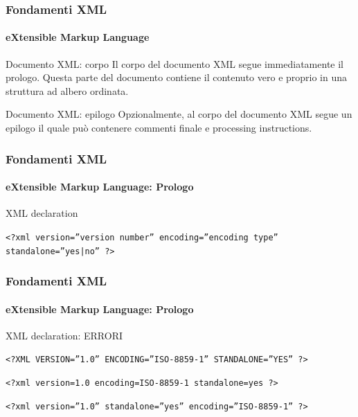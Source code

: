 \begin{frame}
	\frametitle{Fondamenti XML}
	\framesubtitle{eXtensible Markup Language}
	\addtocounter{nframe}{1}

	\begin{block}{Documento XML: corpo}
		Il corpo del documento XML segue immediatamente il prologo. Questa parte del documento contiene il contenuto vero e proprio in una struttura ad albero ordinata.
	\end{block}

	\begin{block}{Documento XML: epilogo}
		Opzionalmente, al corpo del documento XML segue un epilogo il quale può contenere commenti finale e processing instructions.
	\end{block}
	

\end{frame}

\begin{frame}
	\frametitle{Fondamenti XML}
	\framesubtitle{eXtensible Markup Language: Prologo}
	\addtocounter{nframe}{1}

	\begin{block}{XML declaration}
    \begin{center}\texttt{<?xml version=”version number” encoding=”encoding type” standalone=”yes|no” ?>}\end{center}
	\end{block}

\end{frame}


\begin{frame}
	\frametitle{Fondamenti XML}
	\framesubtitle{eXtensible Markup Language: Prologo}
	\addtocounter{nframe}{1}

	\begin{block}{XML declaration: ERRORI}
	\begin{center}\texttt{<?XML VERSION=”1.0” ENCODING=”ISO-8859-1” STANDALONE=”YES” ?>}\end{center}
	\begin{center}\texttt{<?xml version=1.0 encoding=ISO-8859-1 standalone=yes ?>}\end{center}
	\begin{center}\texttt{<?xml version=”1.0” standalone=”yes” encoding=”ISO-8859-1” ?>}\end{center}
	\end{block}

\end{frame}

